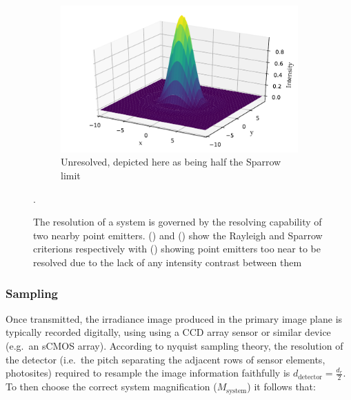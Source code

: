     \begin{figure}
\ContinuedFloat\begin{subfigure}[b]{\textwidth}
        \includegraphics{+airy_too_close}
        \caption{Unresolved, depicted here as being half the Sparrow limit}\label{fig:airy_too_close}
    \end{subfigure}
    \caption[Resolution criterion]{The resolution of a system is governed by the resolving capability of two nearby point emitters.
    () and () show the Rayleigh and Sparrow criterions respectively with () showing point emitters too near to be resolved due to the lack of any intensity contrast between them}\label{fig:airy_disk_resolution}.
\end{figure}

%

\subsubsection{Sampling}


Once transmitted, the irradiance image produced in the primary image plane is typically recorded digitally, using using a \gls{CCD} array sensor or similar device (e.g.~an \gls{sCMOS} array).
According to \Gls{nyquist sampling theory}, the resolution of the detector (i.e.~the pitch separating the adjacent rows of sensor elements, \gls{photosite}s) required to resample the image information faithfully is \(d_\text{detector} = \frac{d_r}{2}\).
To then choose the correct system magnification (\(M_\text{system}\)) it follows that:

